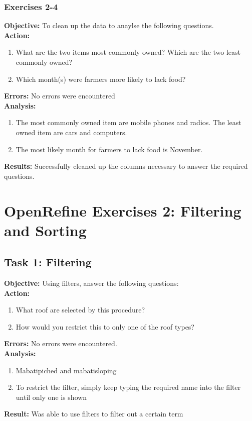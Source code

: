 \documentclass{article}
\begin{document}
\subsubsection{Exercises 2-4}
\textbf{Objective:} To clean up the data to anaylse the following questions.\\
\textbf{Action:}
\begin{enumerate}
    \item What are the two items most commonly owned? Which are the two least commonly owned?
    \item Which month(s) were farmers more likely to lack food?
\end{enumerate}
\textbf{Errors:} No errors were encountered\\
\textbf{Analysis:}
\begin{enumerate}
    \item The most commonly owned item are mobile phones and radios. The least owned item are cars and computers.
    \item The most likely month for farmers to lack food is November.
\end{enumerate}
\textbf{Results:} Successfully cleaned up the columns necessary to answer the required questions.
\section{OpenRefine Exercises 2: Filtering and Sorting}
\subsection{Task 1: Filtering}
\textbf{Objective:} Using filters, answer the following questions:\\
\textbf{Action:}
\begin{enumerate}
    \item What roof are selected by this procedure?
    \item How would you restrict this to only one of the roof types?
\end{enumerate}
\textbf{Errors:} No errors were encountered.\\
\textbf{Analysis:}
\begin{enumerate}
    \item Mabatipiched and mabatisloping
    \item To restrict the filter, simply keep typing the required name into the filter until only one is shown
\end{enumerate}
\textbf{Result:} Was able to use filters to filter out a certain term
\end{document}
